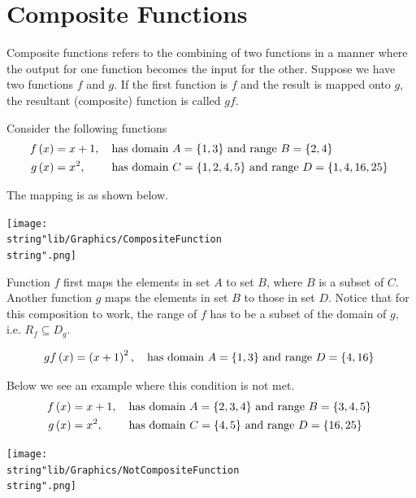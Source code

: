 \documentclass[11pt,a4paper]{book}
\begin{document}
\newpage
\section{Composite Functions}

Composite functions refers to the combining of two functions in a
manner where the output for one function becomes the input for the
other. Suppose we have two functions $f$ and $g$. If the first function
is $f$ and the result is mapped onto $g$, the resultant (composite)
function is called $gf$.

Consider the following functions
\begin{align*}
f\left(x\right) & =x+1,\quad\text{has domain \ensuremath{A=\left\{ 1,3\right\} } and range \ensuremath{B=\left\{ 2,4\right\} } }\\
g\left(x\right) & =x^{2},\hspace{0.8cm}\text{has domain \ensuremath{C=\left\{ 1,2,4,5\right\} } and range \ensuremath{D=\left\{ 1,4,16,25\right\} } }
\end{align*}

The mapping is as shown below.
\begin{center}
\texttt{[image: \\string"lib/Graphics/CompositeFunction\\string".png]}
\par\end{center}

Function $f$ first maps the elements in set $A$ to set $B$, where
$B$ is a subset of $C$. Another function $g$ maps the elements
in set $B$ to those in set $D$. Notice that for this composition
to work, the range of $f$ has to be a subset of the domain of $g$,
i.e. $R_{f}\subseteq D_{g}$.

\[
gf\left(x\right)=\left(x+1\right)^{2},\quad\text{has domain \ensuremath{A=\left\{ 1,3\right\} } and range \ensuremath{D=\left\{ 4,16\right\} } }
\]

Below we see an example where this condition is not met.
\begin{align*}
f\left(x\right) & =x+1,\quad\text{has domain \ensuremath{A=\left\{ 2,3,4\right\} } and range \ensuremath{B=\left\{ 3,4,5\right\} } }\\
g\left(x\right) & =x^{2},\hspace{0.8cm}\text{has domain \ensuremath{C=\left\{ 4,5\right\} } and range \ensuremath{D=\left\{ 16,25\right\} } }
\end{align*}

\begin{center}
\texttt{[image: \\string"lib/Graphics/NotCompositeFunction\\string".png]}
\par\end{center}
\end{document}
